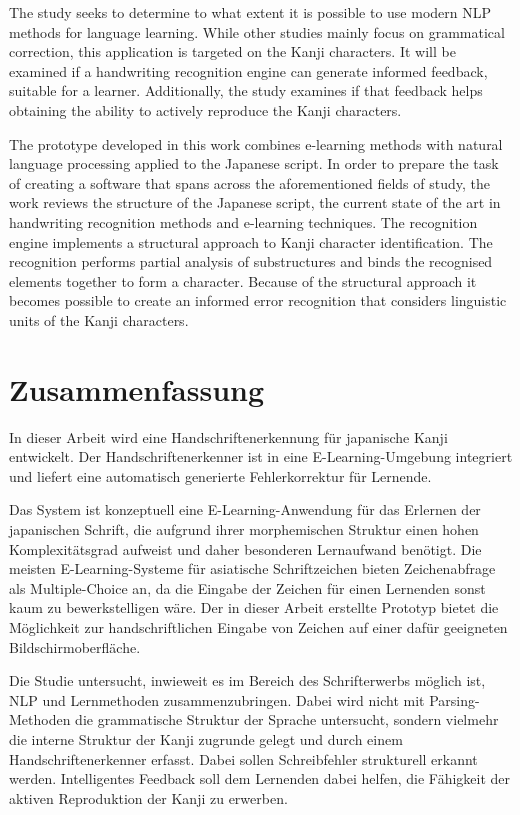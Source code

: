 The study seeks to determine to what extent it is possible to use modern NLP 
methods for language learning. While other studies mainly focus on grammatical
correction, this application is targeted on the Kanji characters. It will be 
examined if a handwriting recognition engine can generate informed feedback,
suitable for a learner. Additionally, the study examines if that feedback helps 
obtaining the ability to actively reproduce the Kanji characters.

The prototype developed in this work combines e-learning methods with natural
language processing applied to the Japanese script. In order to prepare the 
task of creating a software that spans across the aforementioned fields of study,
the work reviews the structure of the Japanese script, the current state of 
the art in handwriting recognition methods and e-learning techniques.
The recognition engine implements a structural approach to Kanji character 
identification. The recognition performs partial analysis of substructures
and binds the recognised elements together to form a character.
Because of the structural approach it becomes possible to create an informed
error recognition that considers linguistic units of the Kanji characters.

\chapter*{Zusammenfassung}
\label{chap:zusammenfassung}

In dieser Arbeit wird eine Handschriftenerkennung für japanische Kanji 
entwickelt. Der Handschriftenerkenner ist in eine E-Learning-Umgebung integriert und
liefert eine automatisch generierte Fehlerkorrektur für Lernende.

Das System ist konzeptuell eine E-Learning-Anwendung für das Erlernen 
der japanischen Schrift, die aufgrund ihrer morphemischen Struktur einen
hohen Komplexitätsgrad aufweist und daher besonderen Lernaufwand benötigt.
Die meisten E-Learning-Systeme für asiatische Schriftzeichen bieten Zeichenabfrage
als Multiple-Choice an, da die Eingabe der Zeichen für einen Lernenden sonst kaum 
zu bewerkstelligen wäre. Der in dieser Arbeit erstellte Prototyp bietet die Möglichkeit 
zur handschriftlichen Eingabe von Zeichen auf einer dafür geeigneten Bildschirmoberfläche.

Die Studie untersucht, inwieweit es im Bereich des Schrifterwerbs möglich ist, 
NLP und Lernmethoden zusammenzubringen. Dabei wird nicht 
mit Parsing-Methoden die grammatische Struktur der Sprache untersucht,
sondern vielmehr die interne Struktur der Kanji zugrunde gelegt und
durch einem Handschriftenerkenner erfasst. Dabei sollen Schreibfehler 
strukturell erkannt werden. Intelligentes Feedback soll dem Lernenden
dabei helfen, die Fähigkeit der aktiven Reproduktion der Kanji zu erwerben.

